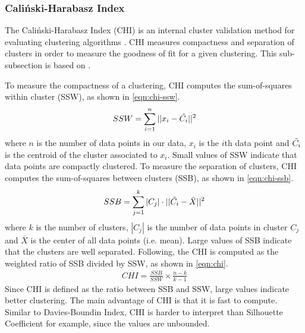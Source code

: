 \subsubsection{Caliński-Harabasz Index}
\label{sec:calinski-harabasz-index}
The Caliński-Harabasz Index (CHI) is an internal cluster validation method for evaluating clustering algorithms \cite{CalinskiHarabasz1974}. CHI measures compactness and separation of clusters in order to measure the goodness of fit for a given clustering. This sub-subsection is based on \cite{CalinskiHarabasz1974}.

To measure the compactness of a clustering, CHI computes the sum-of-squares within cluster (SSW), as shown in \cref{eqn:chi-ssw}.
\begin{align}
    SSW = \sum\limits_{i=1}^{n} ||x_i - \Tilde{C_i}||^2
    \label{eqn:chi-ssw}
\end{align}
where $n$ is the number of data points in our data, $x_i$ is the $i$th data point and $\Tilde{C_i}$ is the centroid of the cluster associated to $x_i$. Small values of SSW indicate that data points are compactly clustered. To measure the separation of clusters, CHI computes the sum-of-squares between clusters (SSB), as shown in \cref{eqn:chi-ssb}.
\begin{align}
    SSB = \sum\limits_{j=1}^{k} |C_j| \cdot ||\Tilde{C_i} - \Bar{X}||^2
    \label{eqn:chi-ssb}
\end{align}
where $k$ is the number of clusters, $|C_j|$ is the number of data points in cluster $C_j$ and $\overline{X}$ is the center of all data points (i.e. mean). Large values of SSB indicate that the clusters are well separated. Following, the CHI is computed as the weighted ratio of SSB divided by SSW, as shown in \cref{eqn:chi}.
\begin{align}
    CHI = \frac{SSB}{SSW} \times \frac{n - k}{k - 1}
    \label{eqn:chi}
\end{align}
Since CHI is defined as the ratio between SSB and SSW, large values indicate better clustering. The main advantage of CHI is that it is fast to compute. Similar to Davies-Boundin Index, CHI is harder to interpret than Silhouette Coefficient for example, since the values are unbounded.

